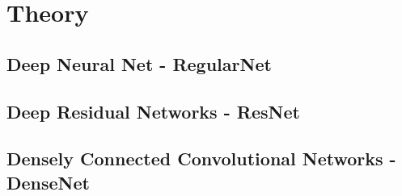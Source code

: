 \chapter{Theory}
\label{chp:theory}

\section{Deep Neural Net - RegularNet}
\section{Deep Residual Networks - ResNet}
\section{Densely Connected Convolutional Networks - DenseNet}